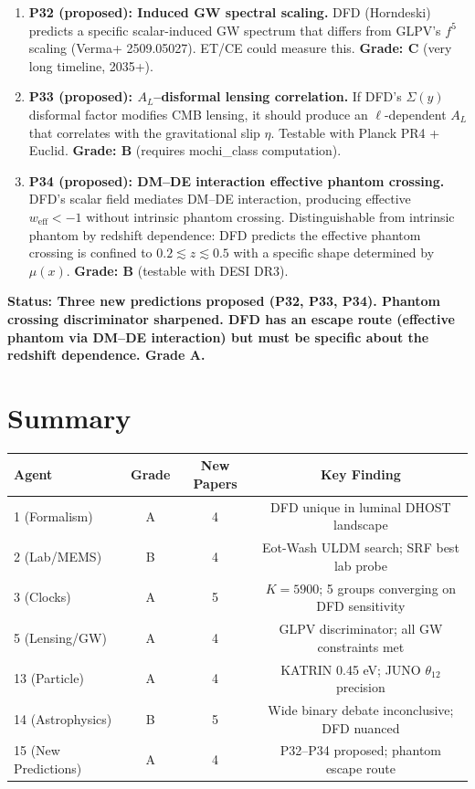 \documentclass[11pt,a4paper]{article}
\begin{document}
\begin{enumerate}
\item \textbf{P32 (proposed): Induced GW spectral scaling.} DFD (Horndeski) predicts a specific scalar-induced GW spectrum that differs from GLPV's $f^5$ scaling (Verma+ 2509.05027). ET/CE could measure this. \textbf{Grade: C} (very long timeline, 2035+).

\item \textbf{P33 (proposed): $A_L$--disformal lensing correlation.} If DFD's $\Sigma(y)$ disformal factor modifies CMB lensing, it should produce an $\ell$-dependent $A_L$ that correlates with the gravitational slip $\eta$. Testable with Planck PR4 + Euclid. \textbf{Grade: B} (requires mochi\_class computation).

\item \textbf{P34 (proposed): DM--DE interaction effective phantom crossing.} DFD's scalar field mediates DM--DE interaction, producing effective $w_\mathrm{eff} < -1$ without intrinsic phantom crossing. Distinguishable from intrinsic phantom by redshift dependence: DFD predicts the effective phantom crossing is confined to $0.2 \lesssim z \lesssim 0.5$ with a specific shape determined by $\mu(x)$. \textbf{Grade: B} (testable with DESI DR3).
\end{enumerate}

\textbf{Status: Three new predictions proposed (P32, P33, P34). Phantom crossing discriminator sharpened. DFD has an escape route (effective phantom via DM--DE interaction) but must be specific about the redshift dependence. Grade A.}

\section{Summary}

\begin{center}
\begin{tabular}{lccc}
\toprule
\textbf{Agent} & \textbf{Grade} & \textbf{New Papers} & \textbf{Key Finding} \\
\midrule
1 (Formalism) & A & 4 & DFD unique in luminal DHOST landscape \\
2 (Lab/MEMS) & B & 4 & Eot-Wash ULDM search; SRF best lab probe \\
3 (Clocks) & A & 5 & $K=5900$; 5 groups converging on DFD sensitivity \\
5 (Lensing/GW) & A & 4 & GLPV discriminator; all GW constraints met \\
13 (Particle) & A & 4 & KATRIN 0.45 eV; JUNO $\theta_{12}$ precision \\
14 (Astrophysics) & B & 5 & Wide binary debate inconclusive; DFD nuanced \\
15 (New Predictions) & A & 4 & P32--P34 proposed; phantom escape route \\
\bottomrule
\end{tabular}
\end{center}
\end{document}
